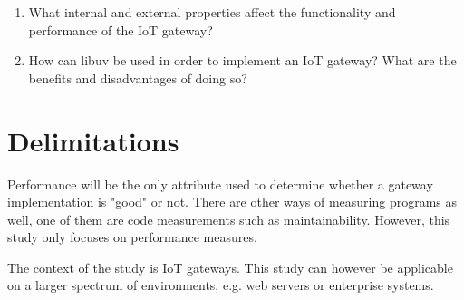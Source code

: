 \begin{enumerate}

    \item What internal and external properties affect the functionality and
        performance of the IoT gateway?

    \item How can libuv be used in order to implement an IoT gateway? What are
        the benefits and disadvantages of doing so?

\end{enumerate}

\section{Delimitations}
\label{sec:delimitations}

Performance will be the only attribute used to determine whether a gateway
implementation is "good" or not. There are other ways of measuring programs as
well, one of them are code measurements such as maintainability. However, this
study only focuses on performance measures.

The context of the study is IoT gateways. This study can however be applicable
on a larger spectrum of environments, e.g. web servers or enterprise systems.

